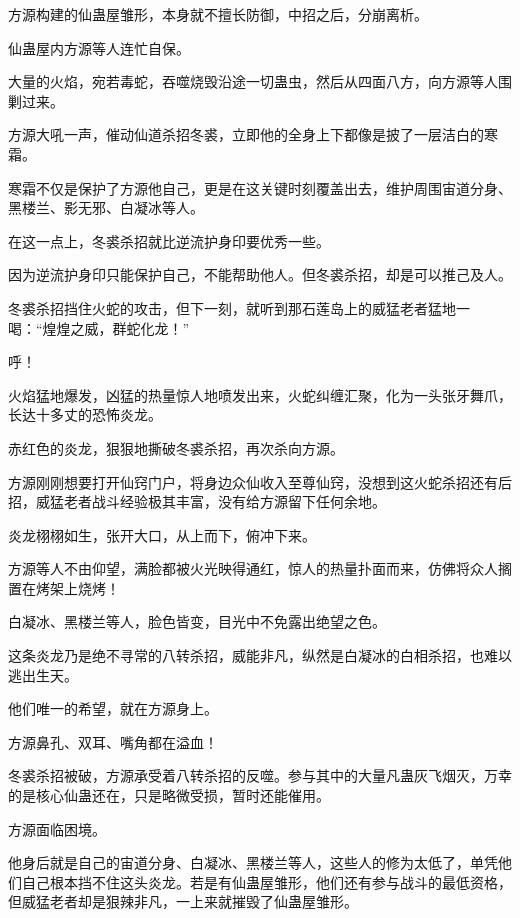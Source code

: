 
\begin{this_body}



方源构建的仙蛊屋雏形，本身就不擅长防御，中招之后，分崩离析。

仙蛊屋内方源等人连忙自保。

大量的火焰，宛若毒蛇，吞噬烧毁沿途一切蛊虫，然后从四面八方，向方源等人围剿过来。

方源大吼一声，催动仙道杀招冬裘，立即他的全身上下都像是披了一层洁白的寒霜。

寒霜不仅是保护了方源他自己，更是在这关键时刻覆盖出去，维护周围宙道分身、黑楼兰、影无邪、白凝冰等人。

在这一点上，冬裘杀招就比逆流护身印要优秀一些。

因为逆流护身印只能保护自己，不能帮助他人。但冬裘杀招，却是可以推己及人。

冬裘杀招挡住火蛇的攻击，但下一刻，就听到那石莲岛上的威猛老者猛地一喝：“煌煌之威，群蛇化龙！”

呼！

火焰猛地爆发，凶猛的热量惊人地喷发出来，火蛇纠缠汇聚，化为一头张牙舞爪，长达十多丈的恐怖炎龙。

赤红色的炎龙，狠狠地撕破冬裘杀招，再次杀向方源。

方源刚刚想要打开仙窍门户，将身边众仙收入至尊仙窍，没想到这火蛇杀招还有后招，威猛老者战斗经验极其丰富，没有给方源留下任何余地。

炎龙栩栩如生，张开大口，从上而下，俯冲下来。

方源等人不由仰望，满脸都被火光映得通红，惊人的热量扑面而来，仿佛将众人搁置在烤架上烧烤！

白凝冰、黑楼兰等人，脸色皆变，目光中不免露出绝望之色。

这条炎龙乃是绝不寻常的八转杀招，威能非凡，纵然是白凝冰的白相杀招，也难以逃出生天。

他们唯一的希望，就在方源身上。

方源鼻孔、双耳、嘴角都在溢血！

冬裘杀招被破，方源承受着八转杀招的反噬。参与其中的大量凡蛊灰飞烟灭，万幸的是核心仙蛊还在，只是略微受损，暂时还能催用。

方源面临困境。

他身后就是自己的宙道分身、白凝冰、黑楼兰等人，这些人的修为太低了，单凭他们自己根本挡不住这头炎龙。若是有仙蛊屋雏形，他们还有参与战斗的最低资格，但威猛老者却是狠辣非凡，一上来就摧毁了仙蛊屋雏形。


\end{this_body}
